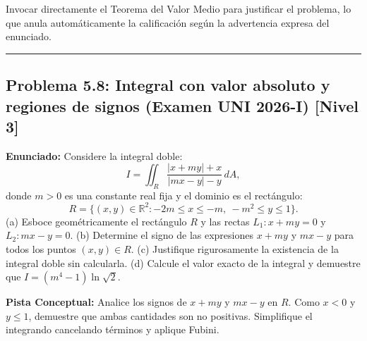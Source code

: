 \documentclass[11pt,a4paper]{article}
\begin{document}
\begin{trapbox}
Invocar directamente el Teorema del Valor Medio para justificar el problema, lo que anula automáticamente la calificación según la advertencia expresa del enunciado.
\end{trapbox}

\vspace{0.5cm}
\hrule
\vspace{0.5cm}

\subsection*{Problema 5.8: Integral con valor absoluto y regiones de signos (Examen UNI 2026-I) \hfill \color{primaryblue}\small[Nivel 3]}

\begin{tcolorbox}[colback=white,colframe=gray!40,arc=1mm,boxrule=0.5pt,left=3mm,right=3mm,top=2mm,bottom=2mm]
\textbf{Enunciado:} Considere la integral doble:
\begin{equation*}
I = \iint_R \frac{|x + my| + x}{|mx - y| - y} \, dA,
\end{equation*}
donde $m > 0$ es una constante real fija y el dominio es el rectángulo:
\begin{equation*}
R = \{(x,y) \in \mathbb{R}^2 : -2m \le x \le -m, \ -m^2 \le y \le 1\}.
\end{equation*}
(a) Esboce geométricamente el rectángulo $R$ y las rectas $L_1: x + my = 0$ y $L_2: mx - y = 0$.
(b) Determine el signo de las expresiones $x + my$ y $mx - y$ para todos los puntos $(x,y) \in R$.
(c) Justifique rigurosamente la existencia de la integral doble sin calcularla.
(d) Calcule el valor exacto de la integral y demuestre que $I = (m^4 - 1)\ln\sqrt{2}$.
\end{tcolorbox}

\begin{tcolorbox}[colback=yellow!4,colframe=accentamber!70,arc=1mm,boxrule=0.5pt,left=3mm,right=3mm,top=1.5mm,bottom=1.5mm]
\textbf{Pista Conceptual:} Analice los signos de $x+my$ y $mx-y$ en $R$. Como $x < 0$ y $y \le 1$, demuestre que ambas cantidades son no positivas. Simplifique el integrando cancelando términos y aplique Fubini.
\end{tcolorbox}
\end{document}
